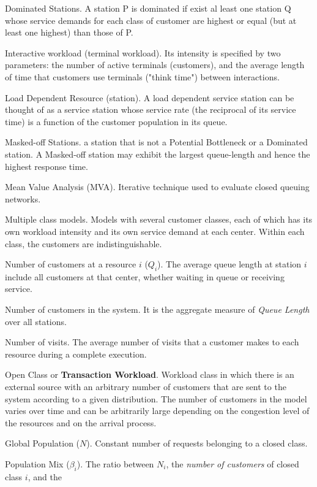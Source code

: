 \begin{description*}
\item[Dominated Stations.] A station P is dominated if exist al
least one station Q whose service demands for each class of
customer are highest or equal (but at least one highest) than
those of P. \item[Interactive workload (terminal workload).] Its
intensity is specified by two parameters: the number of active
terminals (customers), and the average length of time that
customers use terminals ("think time") between interactions.
\item[Load Dependent Resource (station).] A load dependent service
station can be thought of as a service station whose service rate
(the reciprocal of its service time) is a function of the customer
population in its queue. \item[Masked-off Stations.] a station
that is not a Potential Bottleneck or a Dominated station. A
Masked-off station may exhibit the largest queue-length and hence
the highest response time. \item[Mean Value Analysis (MVA).]
Iterative technique used to evaluate closed queuing networks.
\item[Multiple class models.] Models with several customer
classes, each of which has its own workload intensity and its own
service demand at each center. Within each class, the customers
are indistinguishable. \item[Number of customers at a resource $i$
($Q_i$).] The average queue length at station $i$ include all
customers at that center, whether waiting in queue or receiving
service. \item[Number of customers in the system.] It is the
aggregate measure of \emph{Queue Length} over all stations.
\item[Number of visits.] The average number of visits that a
customer makes to each resource during a complete execution.
\item[Open Class]  or {\bf Transaction Workload}. Workload class
in which there is an external source with an arbitrary number of
customers that are sent to the system according to a given
distribution. The number of customers in the model varies over
time and can be arbitrarily large depending on the congestion
level of the resources and on the arrival process. \item[Global
Population ($N$).] Constant number of requests belonging to a
closed class. \item[Population Mix ($\beta_i$).] The ratio between
$N_i$, the \emph{number of customers} of closed class $i$, and the

\end{description*}
